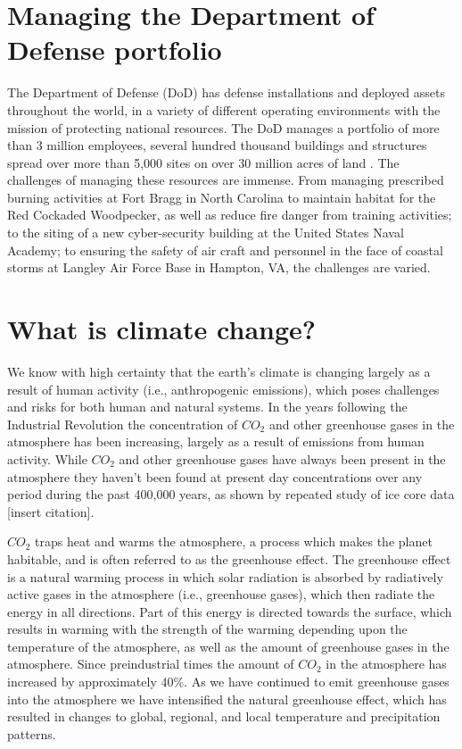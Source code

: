 \documentclass[10pt]{amsart}
\begin{document}
\section{Managing the Department of Defense portfolio}
The Department of Defense (DoD) has defense installations and deployed assets throughout the world, in a variety of different operating environments with the mission of protecting national resources.
The DoD manages a portfolio of more than 3 million employees, several hundred thousand buildings and structures spread over more than 5,000 sites on over 30 million acres of land \parencite{dodassets2016}.
The challenges of managing these resources are immense.
From managing prescribed burning activities at Fort Bragg in North Carolina to maintain habitat for the Red Cockaded Woodpecker, as well as reduce fire danger from training activities; to the siting of a new cyber-security building at the United States Naval Academy; to ensuring the safety of air craft and personnel in the face of coastal storms at Langley Air Force Base in Hampton, VA, the challenges are varied.

\section{What is climate change?}
We know with high certainty that the earth's climate is changing largely as a result of human activity (i.e., anthropogenic emissions), which poses challenges and risks for both human and natural systems.
In the years following the Industrial Revolution the concentration of $CO_2$ and other greenhouse gases in the atmosphere has been increasing, largely as a result of emissions from human activity.
While $CO_2$ and other greenhouse gases have always been present in the atmosphere they haven't been found at present day concentrations over any period during the past 400,000 years, as shown by repeated study of ice core data \parencite{}[insert citation].

$CO_2$ traps heat and warms the atmosphere, a process which makes the planet habitable, and is often referred to as the greenhouse effect. 
The greenhouse effect is a natural warming process in which solar radiation is absorbed by radiatively active gases in the atmosphere (i.e., greenhouse gases), which then radiate the energy in all directions.
Part of this energy is directed towards the surface, which results in warming with the strength of the warming depending upon the temperature of the atmosphere, as well as the amount of greenhouse gases in the atmosphere.
Since preindustrial times the amount of $CO_2$ in the atmosphere has increased by approximately 40\%.
As we have continued to emit greenhouse gases into the atmosphere we have intensified the natural greenhouse effect, which has resulted in changes to global, regional, and local temperature and precipitation patterns.
\end{document}
